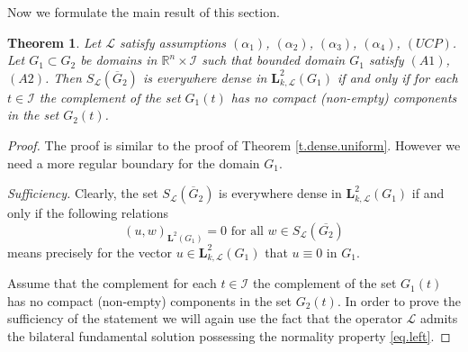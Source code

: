 \documentclass{amsart}
\newtheorem{thm}{Theorem}[section]
\theoremstyle{definition}
\theoremstyle{remark}
\numberwithin{equation}{section}
\begin{document}
Now we formulate the main result of this section.

\begin{thm}
\label{t.dense.base}
Let ${\mathcal L}$ satisfy assumptions $(\alpha_1)$, $(\alpha_2)$, $(\alpha_3)$, 
$(\alpha_4)$, $(UCP)$. Let  $G_1 \subset G_2 $ be  domains in ${\mathbb R}^{n}
\times \mathcal{I}$ such that bounded domain $G_1$  satisfy $(A1)$, $(A2)$.  Then 
$S_{\mathcal L}(\overline G_2)$ is everywhere dense in $\mathbf{L}^{2} _{k,\mathcal L}(G_1)$ 
if and only if for each $t \in {\mathcal I}$ the complement of the set  $G_1 (t) $   has no 
compact (non-empty) components in the set $G_2 (t)$.  
\end{thm}


\begin{proof} The proof is similar to the proof of Theorem \ref{t.dense.uniform}. However 
we need a more regular boundary for the domain $G_1$. 

\textit{Sufficiency.} Clearly, the set 
 $S_{\mathcal L}(\overline G_2)$ is everywhere dense in
 $\mathbf{L}^{2} _{k,\mathcal L}(G_1)$ if and only if the 
following relations 
\begin{equation} \label{eq.ort}
(u,w)_{\mathbf{L}^2 (G_1)} = 0 \mbox{ for all } w\in 
S_{\mathcal L}(\overline {G_2})
\end{equation}
means precisely for  the  vector $u\in \mathbf{L}^{2} _{k,\mathcal L}(G_1)$ 
that $u\equiv 0$ in $G_1$. 

Assume that the complement for each $t \in\mathcal{I}$   
the complement of the set  $G_1 (t) $   has no compact 
(non-empty) components in the set $G_2 (t)$. In order to prove the sufficiency of the statement we will again use the fact that the operator ${\mathcal L}$ admits the bilateral 
fundamental solution possessing the normality property \eqref{eq.left}. 


\end{proof}
\end{document}
